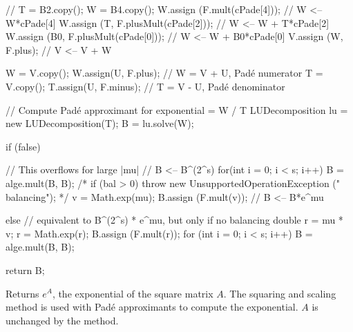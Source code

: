 \begin{code}
\begin{hide}
{      // T = B2.copy();
      W = B4.copy();
      W.assign (F.mult(cPade[4]));           // W <-- W*cPade[4]
      W.assign (T, F.plusMult(cPade[2]));    // W <-- W + T*cPade[2]
      W.assign (B0, F.plusMult(cPade[0]));   // W <-- W + B0*cPade[0]
      V.assign (W, F.plus);                  // V <-- V + W

      W = V.copy();
      W.assign(U, F.plus);                   // W = V + U, Padé numerator
      T = V.copy();
      T.assign(U, F.minus);                  // T = V - U, Padé denominator

      // Compute Padé approximant for exponential = W / T
      LUDecomposition lu = new LUDecomposition(T);
      B = lu.solve(W);

      if (false) {
         // This overflows for large |mu|
         // B <-- B^(2^s)
         for(int i = 0; i < s; i++)
            B = alge.mult(B, B);
         /*
         if (bal > 0) {
            throw new UnsupportedOperationException ("   balancing");
         } */
         v = Math.exp(mu);
         B.assign (F.mult(v));               // B <-- B*e^mu

      } else {
         // equivalent to B^(2^s) * e^mu, but only if no balancing
         double r = mu * v;
         r = Math.exp(r);
         B.assign (F.mult(r));
         for (int i = 0; i < s; i++)
            B = alge.mult(B, B);
      }

      return B;
   } \end{hide}
\end{code}
\begin{tabb} Returns $e^A$, the exponential of the square matrix $A$.
The squaring and scaling method \cite{mHIG09a} is used with
Pad\'e approximants to compute the exponential.
$A$ is unchanged by the method.
\end{tabb}
\begin{htmlonly}
\end{htmlonly}
